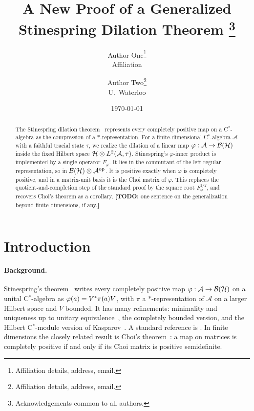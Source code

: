 \documentclass[12pt]{article}
\title{\textbf{A New Proof of a Generalized Stinespring Dilation Theorem}%
\thanks{Acknowledgements common to all authors.}}
\author{
  Author One\thanks{Affiliation details, address, email.} \\
  Affiliation
  \and
  Author Two\thanks{Affiliation details, address, email.} \\
  U.\ Waterloo
}
\date{\today}
\newcommand{\todo}[1]{\textcolor{\mysubcolor}{\small\textbf{[TODO:} #1\textbf{]}}}
\newcommand{\alg}{\mathcal{A}}             %
\newcommand{\hilb}{\mathcal{H}}            %
\newcommand{\bdd}[1]{\mathcal{B}\br{#1}}   %
\newcommand{\op}{^{\mathrm{op}}}           %
\newcommand{\Fphi}{F_{\varphi}}            %
\begin{document}
\maketitle

\begin{abstract}
The Stinespring dilation theorem~\cite{Stinespring1955} represents every
completely positive map on a C\(^*\)-algebra as the compression of a
\(*\)-representation. For a finite-dimensional C\(^*\)-algebra \(\alg\) with a
faithful tracial state \(\tau\), we realize the dilation of a linear map
\(\varphi : \alg \to \bdd{\hilb}\) inside the fixed Hilbert space
\(\hilb \tensor L^2(\alg, \tau)\). Stinespring's \(\varphi\)-inner product is
implemented by a single operator \(\Fphi\). It lies in the commutant of the left
regular representation, so in \(\bdd{\hilb} \tensor \alg\op\). It is positive
exactly when \(\varphi\) is completely positive, and in a matrix-unit basis it is
the Choi matrix of \(\varphi\). This replaces the quotient-and-completion step of
the standard proof by the square root \(\Fphi^{1/2}\), and recovers Choi's
theorem as a corollary. \todo{one sentence on the generalization beyond finite
dimensions, if any.}
\end{abstract}

\tableofcontents

\section{Introduction}
\label{sec:introduction}

\paragraph{Background.}
Stinespring's theorem~\cite{Stinespring1955} writes every completely positive
map \(\varphi : \alg \to \bdd{\hilb}\) on a unital C\(^*\)-algebra as
\(\varphi(a) = V^* \pi(a) V\), with \(\pi\) a \(*\)-representation of
\(\alg\) on a larger Hilbert space and \(V\) bounded. It has many refinements:
minimality and uniqueness up to unitary equivalence~\cite{Arveson1969}, the
completely bounded version, and the Hilbert C\(^*\)-module version of
Kasparov~\cite{Kasparov1980}. A standard reference is \cite{Paulsen2002}. In finite dimensions the closely related result is Choi's
theorem~\cite{Choi1975}: a map on matrices is completely positive if and only if
its Choi matrix is positive semidefinite.
\end{document}

